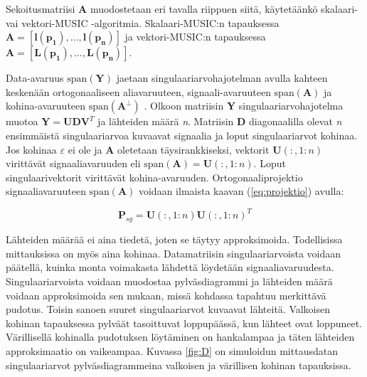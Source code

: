 Sekoitusmatriisi \textbf{A} muodostetaan eri tavalla riippuen siitä, käytetäänkö skalaari- vai vektori-MUSIC -algoritmia. Skalaari-MUSIC:n tapauksessa $\mathbf{A = [l(p_1),...,l(p_n)]}$ ja vektori-MUSIC:n tapauksessa $\mathbf{A = [L(p_1),...,L(p_n)]}$.

Data-avaruus $\text{span}(\mathbf{Y})$ jaetaan singulaariarvohajotelman avulla kahteen keskenään ortogonaaliseen aliavaruuteen, signaali-avaruuteen $\text{span}(\mathbf{A})$  ja kohina-avaruuteen $\text{span}(\mathbf{A^\bot})$ \citep{Mosher1999SourceMUSIC}. Olkoon matriisin \textbf{Y} singulaariarvohajotelma muotoa $\mathbf{Y = UDV}^T$ ja lähteiden määrä \textit{n}. Matriisin \textbf{D} diagonaalilla olevat \textit{n} ensimmäistä singulaariarvoa kuvaavat signaalia ja loput singulaariarvot kohinaa. Jos kohinaa $\varepsilon$ ei ole ja $\mathbf{A}$ oletetaan täysirankkiseksi, vektorit $\mathbf{U}(:,1:n)$ virittävät signaaliavaruuden eli $\text{span}(\mathbf{A}) = \mathbf{U}(:,1:n)$. Loput singulaarivektorit virittävät kohina-avaruuden. \citep{Mosher1999SourceMUSIC, Makela2018TruncatedLocalization} Ortogonaaliprojektio signaaliavaruuteen $\text{span}(\mathbf{A})$ voidaan ilmaista kaavan (\ref{eq:projektio}) avulla:

\begin{equation}
    \mathbf{P}_{sg}=\mathbf{U}(:,1:n)\mathbf{U}(:,1:n)^T
\end{equation} \citep{Makela2018TruncatedLocalization}

Lähteiden määrää ei aina tiedetä, joten se täytyy approksimoida. Todellisissa mittauksissa on myös aina kohinaa. Datamatriisin singulaariarvoista voidaan päätellä, kuinka monta voimakasta lähdettä löydetään signaaliavaruudesta. Singulaariarvoista voidaan muodostaa pylväsdiagrammi ja lähteiden määrä voidaan approksimoida sen mukaan, missä kohdassa tapahtuu merkittävä pudotus. Toisin sanoen suuret singulaariarvot kuvaavat lähteitä. Valkoisen kohinan tapauksessa pylväät tasoittuvat loppupäässä, kun lähteet ovat loppuneet. Värillisellä kohinalla pudotuksen löytäminen on hankalampaa ja täten lähteiden approksimaatio on vaikeampaa. Kuvassa \ref{fig:D} on simuloidun mittausdatan singulaariarvot pylväsdiagrammeina valkoisen ja värillisen kohinan tapauksissa.

